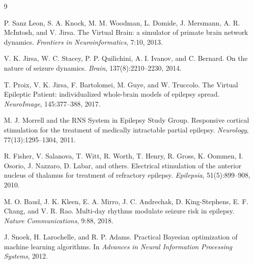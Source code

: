 \documentclass{article}
\begin{document}

\begin{thebibliography}{9}

P. Sanz Leon, S. A. Knock, M. M. Woodman, L. Domide, J. Mersmann, A. R. McIntosh, and V. Jirsa.
\newblock The Virtual Brain: a simulator of primate brain network dynamics.
\newblock \emph{Frontiers in Neuroinformatics}, 7:10, 2013.

V. K. Jirsa, W. C. Stacey, P. P. Quilichini, A. I. Ivanov, and C. Bernard.
\newblock On the nature of seizure dynamics.
\newblock \emph{Brain}, 137(8):2210--2230, 2014.

T. Proix, V. K. Jirsa, F. Bartolomei, M. Guye, and W. Truccolo.
\newblock The Virtual Epileptic Patient: individualized whole-brain models of epilepsy spread.
\newblock \emph{NeuroImage}, 145:377--388, 2017.

M. J. Morrell and the RNS System in Epilepsy Study Group.
\newblock Responsive cortical stimulation for the treatment of medically intractable partial epilepsy.
\newblock \emph{Neurology}, 77(13):1295--1304, 2011.

R. Fisher, V. Salanova, T. Witt, R. Worth, T. Henry, R. Gross, K. Oommen, I. Osorio, J. Nazzaro, D. Labar, and others.
\newblock Electrical stimulation of the anterior nucleus of thalamus for treatment of refractory epilepsy.
\newblock \emph{Epilepsia}, 51(5):899--908, 2010.

M. O. Baud, J. K. Kleen, E. A. Mirro, J. C. Andrechak, D. King-Stephens, E. F. Chang, and V. R. Rao.
\newblock Multi-day rhythms modulate seizure risk in epilepsy.
\newblock \emph{Nature Communications}, 9:88, 2018.

J. Snoek, H. Larochelle, and R. P. Adams.
\newblock Practical Bayesian optimization of machine learning algorithms.
\newblock In \emph{Advances in Neural Information Processing Systems}, 2012.

\end{thebibliography}
\end{document}
